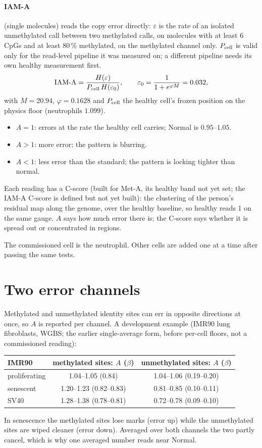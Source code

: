 \paragraph{IAM-A} (single molecules) reads the copy error directly: $\varepsilon$ is the rate of an isolated unmethylated call between two
methylated calls, on molecules with at least 6 CpGs and at least 80\,\% methylated, on the methylated channel only. $P_{\rm cell}$ is valid only for the read-level pipeline it was measured on; a different pipeline needs its own healthy measurement first.
\begin{equation}\text{IAM-A}=\frac{H(\varepsilon)}{P_{\rm cell}\,H(\varepsilon_0)},\qquad \varepsilon_0=\frac{1}{1+e^{\varphi M}}=0.032,\end{equation}
with $M=20.94$, $\varphi=0.1628$ and $P_{\rm cell}$ the healthy cell's frozen position on the physics floor (neutrophils $1.099$).
\begin{itemize}
\item $A=1$: errors at the rate the healthy cell carries; Normal is $0.95$--$1.05$.
\item $A>1$: more error; the pattern is blurring.
\item $A<1$: less error than the standard; the pattern is locking tighter than normal.
\end{itemize}
Each reading has a C-score (built for Met-A, its healthy band not yet set; the IAM-A C-score is defined but not yet built): the clustering of the person's residual map along the genome, over the healthy baseline, so healthy reads 1 on the same
gauge. $A$ says how much error there is; the C-score says whether it is spread out or concentrated in regions.

The commissioned cell is the neutrophil. Other cells are added one at a time after passing the same tests.

\section{Two error channels}
Methylated and unmethylated identity sites can err in opposite directions at once, so $A$ is reported per channel. A development example
(IMR90 lung fibroblasts, WGBS; the earlier single-average form, before per-cell floors, not a commissioned reading):
\begin{center}\small\begin{tabular}{lcc}\toprule
IMR90 & methylated sites: $A$ ($\beta$) & unmethylated sites: $A$ ($\beta$)\\\midrule
proliferating & 1.04--1.05 (0.84) & 1.04--1.06 (0.19--0.20)\\
senescent & 1.20--1.23 (0.82--0.83) & 0.81--0.85 (0.10--0.11)\\
SV40 & 1.28--1.38 (0.78--0.81) & 0.72--0.78 (0.09--0.10)\\\bottomrule
\end{tabular}\end{center}
In senescence the methylated sites lose marks (error up) while the unmethylated sites are wiped cleaner (error down). Averaged over both channels
the two partly cancel, which is why one averaged number reads near Normal.

